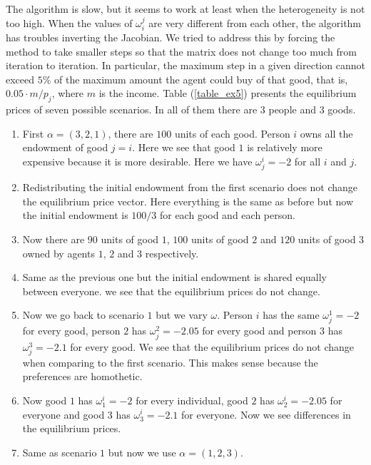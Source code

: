 \documentclass[a4paper,12pt]{article}
\begin{document}
    The algorithm is slow, but it seems to work at least when the heterogeneity is not too high. When the values of $\omega_i^j$ are very different from each other, the algorithm has troubles inverting the Jacobian. We tried to address this by forcing the method to take smaller steps so that the matrix does not change too much from iteration to iteration. In particular, the maximum step in a given direction cannot exceed $5\%$ of the maximum amount the agent could buy of that good, that is, $0.05 \cdot m/p_j$, where $m$ is the income. Table (\ref{table_ex5}) presents the equilibrium prices of seven possible scenarios. In all of them there are $3$ people and $3$ goods.
    
    
    \begin{enumerate}
        \item First $\alpha = (3,2,1)$, there are $100$ units of each good. Person $i$ owns all the endowment of good $j=i$. Here we see that good $1$ is relatively more expensive because it is more desirable. Here we have $\omega_j^i=-2$ for all $i$ and $j$. 
        \item Redistributing the initial endowment from the first scenario does not change the equilibrium price vector. Here everything is the same as before but now the initial endowment is $100/3$ for each good and each person. 
        \item Now there are $90$ units of good $1$, $100$ units of good $2$ and $120$ units of good $3$ owned by agents $1$, $2$ and $3$ respectively. 
        \item Same as the previous one but the initial endowment is shared equally between everyone. we see that the equilibrium prices do not change.  
        \item Now we go back to scenario $1$ but we vary $\omega$. Person $i$ has the same $\omega_j^1 = -2$ for every good, person $2$ has $\omega_j^2 = -2.05$ for every good and person $3$ has $\omega_j^3 = -2.1$ for every good. We see that the equilibrium prices do not change when comparing to the first scenario. This makes sense because the preferences are homothetic. 
        \item Now good $1$ has $\omega_1^i=-2$ for every individual, good $2$ has $\omega_2^i=-2.05$ for everyone and good $3$ has $\omega_3^i=-2.1$ for everyone. Now we see differences in the equilibrium prices. 
        
        \item Same as scenario $1$ but now we use $\alpha = (1,2,3)$. 
    \end{enumerate}
    
\end{document}
